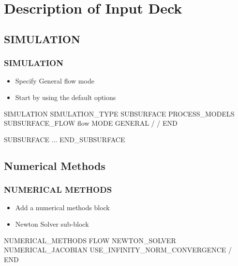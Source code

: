 \documentclass{beamer}
\begin{document}
\section{Description of Input Deck}

\subsection{SIMULATION}

\begin{frame}[fragile]\frametitle{SIMULATION}

\begin{itemize}
\item Specify General flow mode
\item Start by using the default options
\end{itemize}


\begin{semiverbatim}

SIMULATION
  SIMULATION_TYPE SUBSURFACE
  PROCESS_MODELS
    SUBSURFACE_FLOW flow
      MODE GENERAL
    /
  /
END

SUBSURFACE
 ...
END_SUBSURFACE
\end{semiverbatim}

\end{frame}

\subsection{Numerical Methods}

\begin{frame}[fragile]\frametitle{NUMERICAL METHODS}

\begin{itemize}
\item Add a numerical methods block
\item Newton Solver sub-block
\end{itemize}

\begin{semiverbatim}
NUMERICAL_METHODS FLOW
  NEWTON_SOLVER
    NUMERICAL_JACOBIAN
    USE_INFINITY_NORM_CONVERGENCE
  /
END

\end{semiverbatim}

\end{frame}

\end{document}
